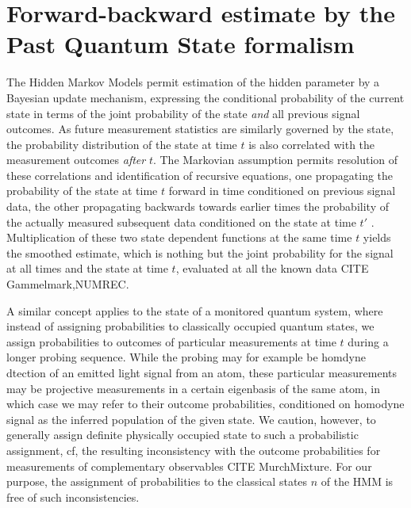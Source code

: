 \documentclass[aps,pra,twocolumn,groupedaddress,showpacs]{revtex4}
\begin{document}
\section{Forward-backward estimate by the Past Quantum State formalism}
The Hidden Markov Models permit estimation of the hidden parameter by a Bayesian update mechanism, expressing the conditional probability of the current state in terms of the joint probability of the state {\it and} all previous signal outcomes. As future measurement statistics are similarly governed by the state, the probability distribution of the state at time $t$ is also correlated with the measurement outcomes {\it after} $t$. The Markovian assumption permits resolution of these correlations and identification of recursive equations, one propagating the probability of the state at time $t$ forward in time conditioned on previous signal data, the other propagating backwards towards earlier times the probability of the actually measured  subsequent data conditioned on the state at time $t'$ . Multiplication of these two state dependent functions at the same time $t$ yields the smoothed estimate, which is nothing but the joint probability for the signal at all times and the state at time $t$,  evaluated at all the known data CITE Gammelmark,NUMREC.

A similar concept applies to the state of a monitored quantum system, where instead of assigning probabilities to classically occupied quantum states, we assign probabilities to outcomes of particular measurements at time $t$ during a longer probing sequence. While the probing may for example be homdyne dtection of an emitted light signal from an atom, these particular measurements may be projective measurements in a certain eigenbasis of the same atom, in which case we may refer to their outcome probabilities, conditioned on homodyne signal as the inferred population of the given state. We caution, however, to generally assign definite  physically occupied state to such a probabilistic assignment, cf, the resulting inconsistency with the outcome probabilities for measurements of complementary observables   CITE MurchMixture. For our purpose, the assignment of probabilities to the classical states $n$ of the HMM is free of such inconsistencies.
\end{document}
